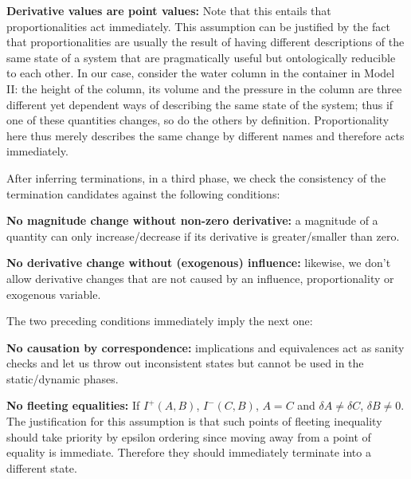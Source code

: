 \documentclass{article}
\begin{document}
\textbf{Derivative values are point values:} Note that this entails that proportionalities act immediately. This assumption can be justified by the fact that proportionalities are usually the result of having different descriptions of the same state of a system that are pragmatically useful but ontologically reducible to each other. In our case, consider the water column in the container in Model II: the height of the column, its volume and the pressure in the column are three different yet dependent ways of describing the same state of the system; thus if one of these quantities changes, so do the others by definition. Proportionality here thus merely describes the same change by different names and therefore acts immediately.

After inferring terminations, in a third phase, we check the consistency of the termination candidates against the following conditions:

\textbf{No magnitude change without non-zero derivative:} a magnitude of a quantity can only increase/decrease if its derivative is greater/smaller than zero. 

\textbf{No derivative change without (exogenous) influence:} likewise, we don't allow derivative changes that are not caused by an influence, proportionality or exogenous variable. 

\noindent The two preceding conditions immediately imply the next one:

\textbf{No causation by correspondence:} implications and equivalences act as sanity checks and let us throw out inconsistent states but cannot be used in the static/dynamic phases.

\textbf{No fleeting equalities:} If $I^+(A,B)$, $I^-(C,B)$, $A=C$ and $\delta A \neq \delta C$, $\delta B \neq 0$. The justification for this assumption is that such points of fleeting inequality should take priority by epsilon ordering since moving away from a point of equality is immediate. Therefore they should immediately terminate into a different state.
\end{document}
